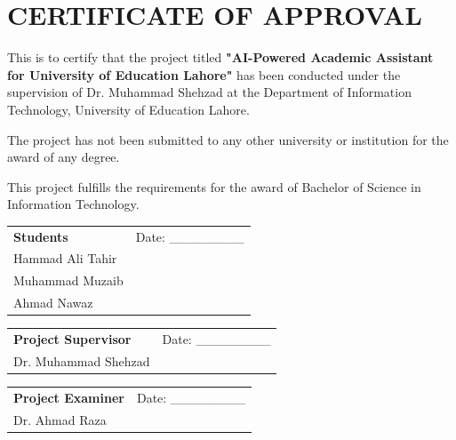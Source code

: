 \documentclass[12pt,a4paper]{book}
\numberwithin{table}{chapter}
\numberwithin{figure}{chapter}
\numberwithin{equation}{chapter}
\begin{document}
\clearpage

\chapter*{CERTIFICATE OF APPROVAL}

\bigskip
This is to certify that the project titled \textbf{"AI-Powered Academic Assistant for University of Education Lahore"} has been conducted under the supervision of Dr. Muhammad Shehzad at the Department of Information Technology, University of Education Lahore.

\bigskip
The project has not been submitted to any other university or institution for the award of any degree.

\bigskip
This project fulfills the requirements for the award of Bachelor of Science in Information Technology.

\bigskip\bigskip

\begin{tabular}{p{3in} p{3in}}
 & \\[1\baselineskip]
\hline
\textbf{Students} & Date: \_\_\_\_\_\_\_\_\\[1\baselineskip]
Hammad Ali Tahir & \\
Muhammad Muzaib & \\
Ahmad Nawaz & \\
\end{tabular}

\bigskip

\begin{tabular}{p{3in} p{3in}}
 & \\[1\baselineskip]
\hline
\textbf{Project Supervisor} & Date: \_\_\_\_\_\_\_\_\\[1\baselineskip]
Dr. Muhammad Shehzad & \\
\end{tabular}

\bigskip

\begin{tabular}{p{3in} p{3in}}
 & \\[1\baselineskip]
\hline
\textbf{Project Examiner} & Date: \_\_\_\_\_\_\_\_\\[1\baselineskip]
Dr. Ahmad Raza & \\
\end{tabular}
\end{document}
